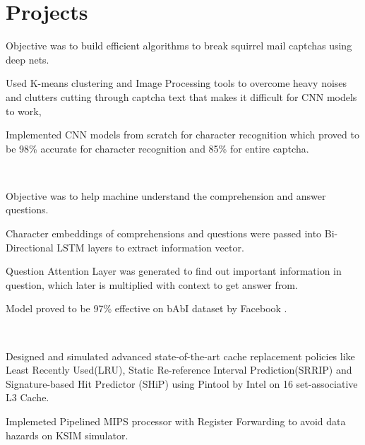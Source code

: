 \documentclass[]{deedy-resume-openfont}
\begin{document}
\begin{minipage}[t]{0.69\textwidth}
\section{Projects}

\begin{tightemize}
\item Objective was to build efficient algorithms to break squirrel mail captchas using deep nets.
\item Used K-means clustering and Image Processing tools to overcome heavy noises and clutters cutting through captcha text that makes it difficult for CNN models to work,
\item Implemented CNN models from scratch for character recognition which proved to be 98\% accurate for character recognition and 85\% for entire captcha.
\end{tightemize}

\\\hspace{0.5cm}

\begin{tightemize}
\item Objective was to help machine understand the comprehension and answer questions.
\item Character embeddings of comprehensions and questions were passed into Bi-Directional LSTM layers to extract information vector.
\item Question Attention Layer was generated to find out important information in question, which later is multiplied with context to get answer from. 
\item Model proved to be 97\% effective on bAbI dataset by Facebook .
\end{tightemize}

\\\hspace{0.5cm}

\begin{tightemize}
\item Designed and simulated advanced state-of-the-art cache replacement policies like Least Recently Used(LRU), Static Re-reference Interval Prediction(SRRIP) and Signature-based Hit Predictor (SHiP) using Pintool by Intel on 16 set-associative L3 Cache.
\item Implemeted Pipelined MIPS processor with Register Forwarding to avoid data hazards on KSIM simulator.
\end{tightemize}


\end{minipage}
\end{document}
